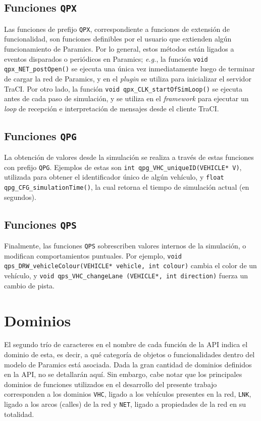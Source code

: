 \subsection{Funciones \texttt{QPX}}

Las funciones de prefijo \texttt{QPX}, correspondiente a funciones de extensión de funcionalidad, son funciones definibles por el usuario que extienden algún funcionamiento de Paramics. Por lo general, estos métodos están ligados a eventos disparados o periódicos en Paramics; \emph{e.g.}, la función \texttt{void qpx\_NET\_postOpen()} se ejecuta una única vez inmediatamente luego de terminar de cargar la red de Paramics, y en el \emph{plugin} se utiliza para inicializar el servidor TraCI. Por otro lado, la función \texttt{void qpx\_CLK\_startOfSimLoop()} se ejecuta antes de cada paso de simulación, y se utiliza en el \emph{framework} para ejecutar un \emph{loop} de recepción e interpretación de mensajes desde el cliente TraCI.

\subsection{Funciones \texttt{QPG}}

La obtención de valores desde la simulación se realiza a través de estas funciones con prefijo \texttt{QPG}. Ejemplos de estas son \texttt{int qpg\_VHC\_uniqueID(VEHICLE* V)}, utilizada para obtener el identificador único de algún vehículo, y \texttt{float qpg\_CFG\_simulationTime()}, la cual retorna el tiempo de simulación actual (en segundos).

\subsection{Funciones \texttt{QPS}}

Finalmente, las funciones \texttt{QPS} sobrescriben valores internos de la simulación, o modifican comportamientos puntuales. Por ejemplo, \texttt{void qps\_DRW\_vehicleColour(VEHICLE* vehicle, int colour)} cambia el color de un vehículo, y \texttt{void qps\_VHC\_changeLane (VEHICLE*, int direction)} fuerza un cambio de pista.

\section{Dominios}

El segundo trío de caracteres en el nombre de cada función de la API indica el dominio de esta, es decir, a qué categoría de objetos o funcionalidades dentro del modelo de Paramics está asociada. Dada la gran cantidad de dominios definidos en la API, no se detallarán aquí. Sin embargo, cabe notar que los principales dominios de funciones utilizados en el desarrollo del presente trabajo corresponden a los dominios \texttt{VHC}, ligado a los vehículos presentes en la red, \texttt{LNK}, ligado a los arcos (calles) de la red y \texttt{NET}, ligado a propiedades de la red en su totalidad.